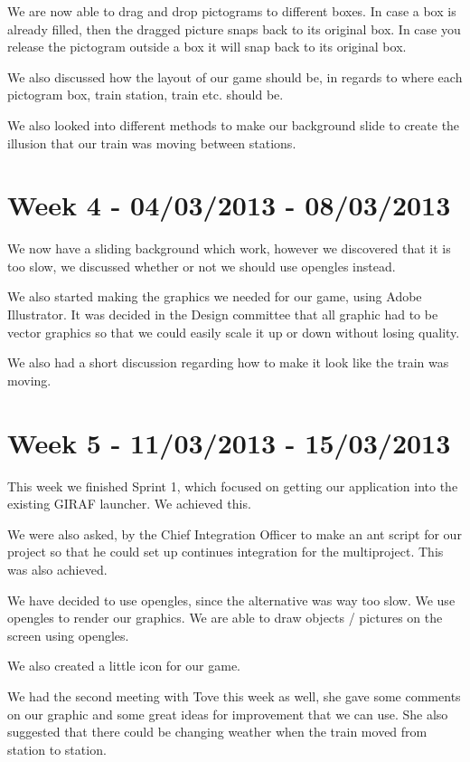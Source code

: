 We are now able to drag and drop pictograms to different boxes. In case a box is already filled, then the dragged picture snaps back to its original box. In case you release the pictogram outside a box it will snap back to its original box. 

We also discussed how the layout of our game should be, in regards to where each pictogram box, train station, train etc. should be. 

We also looked into different methods to make our background slide to create the illusion that our train was moving between stations. 

\section*{Week 4 - 04/03/2013 - 08/03/2013}
We now have a sliding background which work, however we discovered that it is too slow, we discussed whether or not we should use \ac{opengles} instead. 

We also started making the graphics we needed for our game, using Adobe Illustrator. It was decided in the Design committee that all graphic had to be vector graphics so that we could easily scale it up or down without losing quality. 

We also had a short discussion regarding how to make it look like the train was moving.

\section*{Week 5 - 11/03/2013 - 15/03/2013}
This week we finished Sprint 1, which focused on getting our application into the existing GIRAF launcher. We achieved this. 

We were also asked, by the Chief Integration Officer to make an ant script for our project so that he could set up continues integration for the multiproject. This was also achieved. 

We have decided to use \ac{opengles}, since the alternative was way too slow. We use \ac{opengles} to render our graphics. We are able to draw objects / pictures on the screen using \ac{opengles}. 

We also created a little icon for our game. 

We had the second meeting with Tove this week as well, she gave some comments on our graphic and some great ideas for improvement that we can use. She also suggested that there could be changing weather when the train moved from station to station. 

